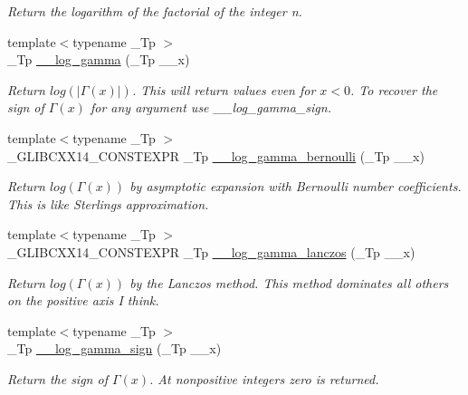 \begin{DoxyCompactItemize}
\begin{DoxyCompactList}\small\item\em Return the logarithm of the factorial of the integer n. \end{DoxyCompactList}\item 
{\footnotesize template$<$typename \+\_\+\+Tp $>$ }\\\+\_\+\+Tp \hyperlink{namespacestd_1_1____detail_aa8be6df2c5d12d0d1cb1f02a6b3592ef}{\+\_\+\+\_\+log\+\_\+gamma} (\+\_\+\+Tp \+\_\+\+\_\+x)
\begin{DoxyCompactList}\small\item\em Return $ log(|\Gamma(x)|) $. This will return values even for $ x < 0 $. To recover the sign of $ \Gamma(x) $ for any argument use {\itshape \+\_\+\+\_\+log\+\_\+gamma\+\_\+sign}. \end{DoxyCompactList}\item 
{\footnotesize template$<$typename \+\_\+\+Tp $>$ }\\\+\_\+\+G\+L\+I\+B\+C\+X\+X14\+\_\+\+C\+O\+N\+S\+T\+E\+X\+P\+R \+\_\+\+Tp \hyperlink{namespacestd_1_1____detail_ac13e31ebcd3c99d6a7cad9010e039315}{\+\_\+\+\_\+log\+\_\+gamma\+\_\+bernoulli} (\+\_\+\+Tp \+\_\+\+\_\+x)
\begin{DoxyCompactList}\small\item\em Return $log(\Gamma(x))$ by asymptotic expansion with Bernoulli number coefficients. This is like Sterling\textquotesingle{}s approximation. \end{DoxyCompactList}\item 
{\footnotesize template$<$typename \+\_\+\+Tp $>$ }\\\+\_\+\+G\+L\+I\+B\+C\+X\+X14\+\_\+\+C\+O\+N\+S\+T\+E\+X\+P\+R \+\_\+\+Tp \hyperlink{namespacestd_1_1____detail_a45d7248fb07a96bc70546b0817a4564e}{\+\_\+\+\_\+log\+\_\+gamma\+\_\+lanczos} (\+\_\+\+Tp \+\_\+\+\_\+x)
\begin{DoxyCompactList}\small\item\em Return $log(\Gamma(x))$ by the Lanczos method. This method dominates all others on the positive axis I think. \end{DoxyCompactList}\item 
{\footnotesize template$<$typename \+\_\+\+Tp $>$ }\\\+\_\+\+Tp \hyperlink{namespacestd_1_1____detail_ac091f187fbe5efdbc912ec9ca38ba25f}{\+\_\+\+\_\+log\+\_\+gamma\+\_\+sign} (\+\_\+\+Tp \+\_\+\+\_\+x)
\begin{DoxyCompactList}\small\item\em Return the sign of $ \Gamma(x) $. At nonpositive integers zero is returned. \end{DoxyCompactList}\item 

\end{DoxyCompactItemize}
